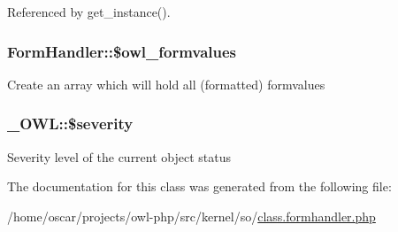 Referenced by get\_\-instance().

\subsubsection[{\$owl\_\-formvalues}]{\setlength{\rightskip}{0pt plus 5cm}FormHandler::\$owl\_\-formvalues}\label{classFormHandler_a2caca98eec368ff030f07f8024253527}
Create an array which will hold all (formatted) formvalues 
\subsubsection[{\$severity}]{\setlength{\rightskip}{0pt plus 5cm}\_\-OWL::\$severity}\label{class__OWL_ad26b40a9dbbacb33e299b17826f8327c}
Severity level of the current object status 

The documentation for this class was generated from the following file:\begin{DoxyCompactItemize}
\item 
/home/oscar/projects/owl-\/php/src/kernel/so/\hyperlink{class_8formhandler_8php}{class.formhandler.php}\end{DoxyCompactItemize}

